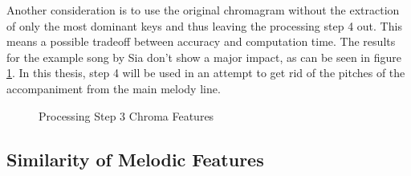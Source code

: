 \noindent Another consideration is to use the original chromagram without the extraction of only the most dominant keys and thus leaving the processing step 4 out. This means a possible tradeoff between accuracy and computation time. The results for the example song by Sia don't show a major impact, as can be seen in figure \ref{fig:nomax}. In this thesis, step 4 will be used in an attempt to get rid of the pitches of the accompaniment from the main melody line.
\begin{figure}[htbp]
	\centering
	\caption{Processing Step 3 Chroma Features}
	\label{fig:nomax}
\end{figure}

\subsection{Similarity of Melodic Features}

